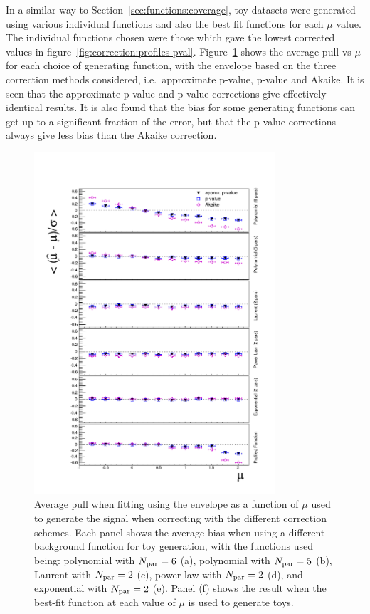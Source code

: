In a similar way to Section~\ref{sec:functions:coverage}, toy datasets
were generated using various individual functions and also the best fit
functions for each $\mu$ value. The individual functions chosen were those
which gave the lowest corrected \nll values in
figure~\ref{fig:correction:profiles-pval}.
Figure~\ref{fig:correction:allorderbias} shows the average pull vs $\mu$
for each choice of generating function, with the envelope based on the
three correction methods considered, i.e.~approximate p-value, p-value 
and Akaike. It is seen that the approximate p-value and p-value corrections give
effectively identical results. It is also found that the bias for some
generating functions can get up to a significant fraction of the error, but
that the p-value corrections always give less bias than the Akaike correction.
%
\begin{figure}[tbp]
\centering
\includegraphics[width=0.8\textwidth]{correction/AllOrderFunctions_call.pdf}
\caption{Average pull when fitting using the envelope as a function of $\mu$
used to generate the signal when correcting
with the different \nll correction schemes.
Each panel shows the average bias when using
a different background function for toy generation, with the functions
used being: polynomial with $N_{\rm par}=6$ (a),
polynomial with $N_{\rm par}=5$ (b), Laurent with $N_{\rm par}=2$ (c),
power law with $N_{\rm par}=2$ (d), and exponential with $N_{\rm par}=2$ (e).
Panel (f) shows the result when the best-fit function at each
value of $\mu$ is used to generate toys.
}
\label{fig:correction:allorderbias}
\end{figure}

